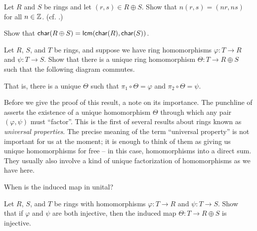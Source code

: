 \begin{exercise}
Let \(R\) and \(S\) be rings and let \((r,s) \in R \oplus S\).
Show that \(n(r,s) = (nr, ns)\) for all \(n \in \mathbb{Z}\).
(cf. .)
\end{exercise}


\begin{exercise}
Show that \(\mathsf{char}(R \oplus S) = \mathsf{lcm}(\mathsf{char}(R), \mathsf{char}(S))\).
\end{exercise}


\begin{exercise} \label{exerc:up-direct-sum} 
Let \(R\), \(S\), and \(T\) be rings, and suppose we have ring homomorphisms \(\varphi : T \rightarrow R\) and \(\psi : T \rightarrow S\).
Show that there is a unique ring homomorphism \(\Theta : T \rightarrow R \oplus S\) such that the following diagram commutes.
\begin{center}
\end{center}
That is, there is a unique \(\Theta\) such that \(\pi_1 \circ \Theta = \varphi\) and \(\pi_2 \circ \Theta = \psi\).
\end{exercise}


Before we give the proof of this result, a note on its importance. The punchline of  asserts the existence of a unique homomorphism \(\Theta\) through which any pair \((\varphi, \psi)\) must ``factor''.
This is the first of several results about rings known as \emph{universal properties}.
The precise meaning of the term ``universal property'' is not important for us at the moment; it is enough to think of them as giving us unique homomorphisms for free -- in this case, homomorphisms into a direct sum.
They usually also involve a kind of unique factorization of homomorphisms as we have here.


\begin{exercise}
When is the induced map in  unital?
\end{exercise}


\begin{exercise}
Let \(R\), \(S\), and \(T\) be rings with homomorphisms \(\varphi : T \rightarrow R\) and \(\psi : T \rightarrow S\).
Show that if \(\varphi\) and \(\psi\) are both injective, then the induced map \(\Theta : T \rightarrow R \oplus S\) is injective.
\end{exercise}



